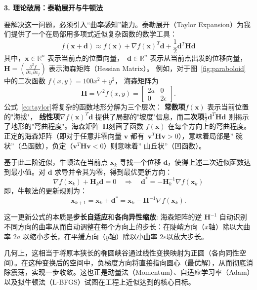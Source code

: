 \textbf{3. 理论破局：泰勒展开与牛顿法}

要解决这一问题，必须引入“曲率感知”能力。泰勒展开（Taylor Expansion）为我们提供了一个在局部用多项式近似复杂函数的数学工具：
\begin{equation}\label{eq:taylor}
f(\mathbf{x}+\mathbf{d}) \approx f(\mathbf{x}) + \nabla f(\mathbf{x})^T\mathbf{d}
+ \frac{1}{2}\mathbf{d}^T\mathbf{H}\mathbf{d}
\end{equation}
其中，$\mathbf{x}\in \mathbb{R}^n$ 表示当前点的位置向量，~$\mathbf{d}\in \mathbb{R}^n$ 表示从当前点出发的位移向量，$\mathbf{H} = \left(\frac{\partial^2 f}{\partial x_i \partial x_j} \right)$ 表示海森矩阵（Hessian Matrix）。 例如，对于图~\ref{fig:paraboloid} 中的二次函数 $ f(x,y) = 100 x^2 + y^2$，  海森矩阵为
\[
\mathbf{H} = \nabla^2 f(x,y) =
\begin{bmatrix}
2a & 0 \\
0 & 2\epsilon
\end{bmatrix}.
\]
公式~\eqref{eq:taylor}将复杂的函数地形分解为三个层次：
\textbf{常数项}$f(\mathbf{x})$ 表示当前位置的"海拔"，
\textbf{线性项}$\nabla f(\mathbf{x})^T\mathbf{d}$ 提供了局部的"坡度"信息，而\textbf{二次项}$\frac{1}{2}\mathbf{d}^T\mathbf{H}\mathbf{d}$ 则揭示了地形的"弯曲程度"。海森矩阵~$\mathbf{H}  $刻画了函数 $f(\mathbf{x})$ 在每个方向上的弯曲程度。正定的海森矩阵（即对于任意非零向量 $\mathbf{v}$ 都有~$\mathbf{v}^T \mathbf{H} \mathbf{v} >0$），意味着局部是” 碗状”（凸函数），负定（$\mathbf{v}^T \mathbf{H} \mathbf{v}<0$）则意味着” 山丘状”（凹函数）。

基于此二阶近似，牛顿法在当前点 $\mathbf{x}_k$ 寻找一个位移 $\mathbf{d}$，使得上述二次近似函数达到最小值。对 $\mathbf{d}$ 求导并令其为零，得到最优更新方向：
$$
\nabla f(\mathbf{x}_k) + \mathbf{H}_k \mathbf{d} = 0 \quad \Rightarrow \quad \mathbf{d}^* = -\mathbf{H}_k^{-1} \nabla f(\mathbf{x}_k)
$$
即，牛顿法的更新规则为：
$$
\mathbf{x}_{k+1} = \mathbf{x}_k + \mathbf{d}^* = \mathbf{x}_k - \mathbf{H}^{-1} \nabla f(\mathbf{x}_k).
$$

这一更新公式的本质是\textbf{步长自适应}和\textbf{各向异性缩放}: 海森矩阵的逆 $\mathbf{H}^{-1}$ 自动识别不同方向的曲率从而自动调整在每个方向上的步长：在陡峭方向（$x$轴）除以大曲率 $2a$ 以缩小步长，在平缓方向（$y$轴）除以小曲率 $2\varepsilon$以放大步长。

几何上，这相当于将原本狭长的椭圆峡谷通过线性变换映射为正圆（各向同性空间）。在这种变换后的空间中，负梯度方向将直接指向圆心（最优解），从而彻底消除震荡，实现一步收敛。这也正是动量法（Momentum）、自适应学习率（Adam）以及拟牛顿法（L-BFGS）试图在工程上近似达到的核心目标。

